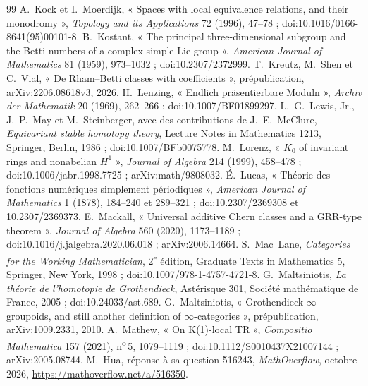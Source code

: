 \documentclass[11pt]{article}
\theoremstyle{plain}
\theoremstyle{definition}
\theoremstyle{plain}
\theoremstyle{definition}
\theoremstyle{remark}
\renewcommand{\_}{\bkunderscore\allowbreak}
\begin{document}
\begin{thebibliography}{99}
 A.~Kock et I.~Moerdijk, « Spaces with local equivalence relations, and their monodromy », \emph{Topology and its Applications} 72 (1996), 47--78 ; doi:10.1016/0166-8641(95)00101-8.
 B.~Kostant, « The principal three-dimensional subgroup and the Betti numbers of a complex simple Lie group », \emph{American Journal of Mathematics} 81 (1959), 973--1032 ; doi:10.2307/2372999.
 T.~Kreutz, M.~Shen et C.~Vial, « De Rham--Betti classes with coefficients », prépublication, arXiv:2206.08618v3, 2026.
 H.~Lenzing, « Endlich präsentierbare Moduln », \emph{Archiv der Mathematik} 20 (1969), 262--266 ; doi:10.1007/BF01899297.
 L.~G.~Lewis, Jr., J.~P.~May et M.~Steinberger, avec des contributions de J.~E.~McClure, \emph{Equivariant stable homotopy theory}, Lecture Notes in Mathematics 1213, Springer, Berlin, 1986 ; doi:10.1007/BFb0075778.
 M.~Lorenz, « $K_0$ of invariant rings and nonabelian $H^1$ », \emph{Journal of Algebra} 214 (1999), 458--478 ; doi:10.1006/jabr.1998.7725 ; arXiv:math/9808032.
 É.~Lucas, « Théorie des fonctions numériques simplement périodiques », \emph{American Journal of Mathematics} 1 (1878), 184--240 et 289--321 ; doi:10.2307/2369308 et 10.2307/2369373.
 E.~Mackall, « Universal additive Chern classes and a GRR-type theorem », \emph{Journal of Algebra} 560 (2020), 1173--1189 ; doi:10.1016/j.jalgebra.2020.06.018 ; arXiv:2006.14664.
 S.~Mac~Lane, \emph{Categories for the Working Mathematician}, 2\textsuperscript{e} édition, Graduate Texts in Mathematics 5, Springer, New York, 1998 ; doi:10.1007/978-1-4757-4721-8.
 G.~Maltsiniotis, \emph{La théorie de l'homotopie de Grothendieck}, Astérisque 301, Société mathématique de France, 2005 ; doi:10.24033/ast.689.
 G.~Maltsiniotis, « Grothendieck $\infty$-groupoids, and still another definition of $\infty$-categories », prépublication, arXiv:1009.2331, 2010.
 A.~Mathew, « On K(1)-local TR », \emph{Compositio Mathematica} 157 (2021), n\textsuperscript{o}\,5, 1079--1119 ; doi:10.1112/S0010437X21007144 ; arXiv:2005.08744.
 M.~Hua, réponse à sa question 516243, \emph{MathOverflow}, octobre 2026, \url{https://mathoverflow.net/a/516350}.


\end{thebibliography}
\end{document}
